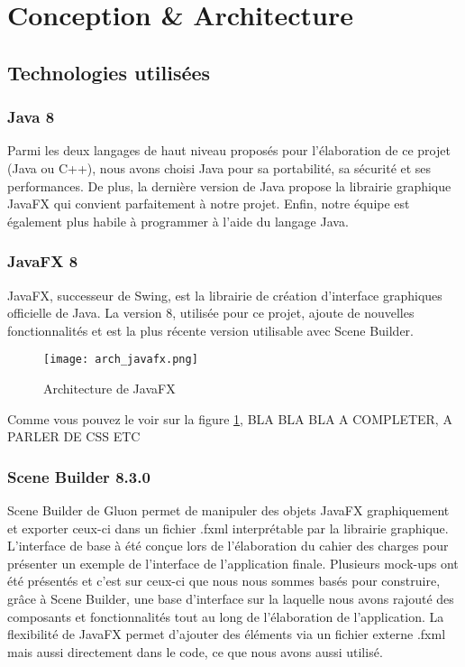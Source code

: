 \section{Conception \& Architecture}
\subsection{Technologies utilisées}
\subsubsection{Java 8}
Parmi les deux langages de haut niveau proposés pour l'élaboration de ce projet (Java ou C++), nous avons choisi Java pour sa portabilité, sa sécurité et ses performances. De plus, la dernière version de Java propose la librairie graphique JavaFX qui convient parfaitement à notre projet. Enfin, notre équipe est également plus habile à programmer à l'aide du langage Java.

\subsubsection{JavaFX 8}
JavaFX, successeur de Swing, est la librairie de création d'interface graphiques officielle de Java. La version 8, utilisée pour ce projet, ajoute de nouvelles fonctionnalités et est la plus récente version utilisable avec Scene Builder.

\begin{figure}[h]
    \caption{Architecture de JavaFX}
    \centering
    \texttt{[image: arch\_javafx.png]}
    \label{fig:arch_javafx}
\end{figure}

Comme vous pouvez le voir sur la figure \ref{fig:arch_javafx}, BLA BLA BLA A COMPLETER, A PARLER DE CSS ETC


\subsubsection{Scene Builder 8.3.0}
Scene Builder de Gluon permet de manipuler des objets JavaFX graphiquement et exporter ceux-ci dans un fichier \og .fxml \fg{} interprétable par la librairie graphique. L'interface de base à été conçue lors de l'élaboration du cahier des charges pour présenter un exemple de l'interface de l'application finale. Plusieurs mock-ups ont été présentés et c'est sur ceux-ci que nous nous sommes basés pour construire, grâce à Scene Builder, une base d'interface sur la laquelle nous avons rajouté des composants et fonctionnalités tout au long de l'élaboration de l'application. La flexibilité de JavaFX permet d'ajouter des éléments via un fichier externe \og .fxml \fg{} mais aussi directement dans le code, ce que nous avons aussi utilisé.

